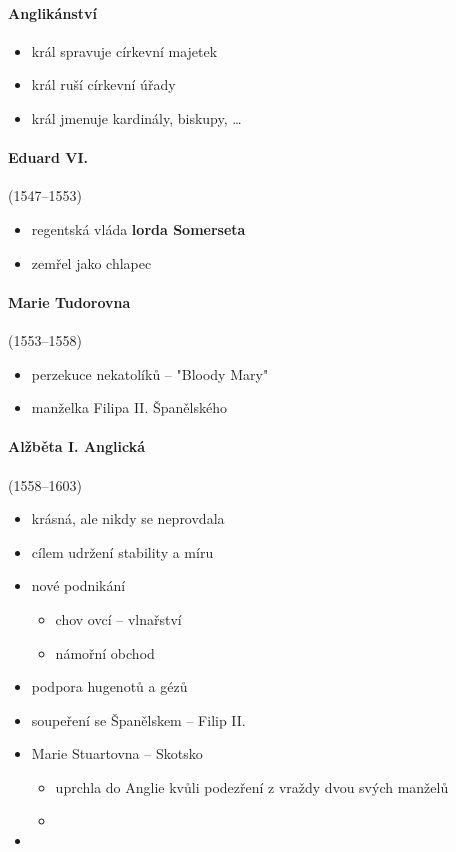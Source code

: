 \paragraph{Anglikánství}
\begin{itemize}
\item král spravuje církevní majetek
\item král ruší církevní úřady
\item král jmenuje kardinály, biskupy, \ldots
\end{itemize}

\paragraph{Eduard VI.} (1547--1553)
\begin{itemize}
\item regentská vláda \textbf{lorda Somerseta}
\item zemřel jako chlapec
\end{itemize}

\paragraph{Marie Tudorovna} (1553--1558)
\begin{itemize}
\item perzekuce nekatolíků -- "Bloody Mary"
\item manželka Filipa II. Španělského
\end{itemize}

\paragraph{Alžběta I. Anglická} (1558--1603)
\begin{itemize}
\item krásná, ale nikdy se neprovdala
\item cílem udržení stability a míru
\item nové podnikání
	\begin{itemize}
	\item chov ovcí -- vlnařství
	\item námořní obchod
	\end{itemize}
\item podpora hugenotů a gézů
\item soupeření se Španělskem -- Filip II.
\item Marie Stuartovna -- Skotsko
	\begin{itemize}
	\item uprchla do Anglie kvůli podezření z vraždy dvou svých manželů
	\item {}
	\end{itemize}
\item {}
\end{itemize}	


